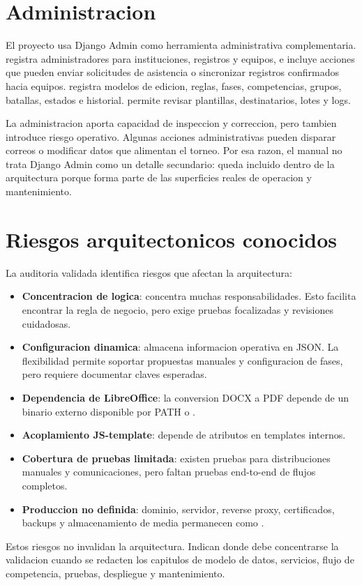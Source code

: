 \section{Administracion}
\label{sec:arquitectura-administracion}

El proyecto usa Django Admin como herramienta administrativa complementaria.  registra administradores para instituciones, registros y equipos, e incluye acciones que pueden enviar solicitudes de asistencia o sincronizar registros confirmados hacia equipos.  registra modelos de edicion, reglas, fases, competencias, grupos, batallas, estados e historial.  permite revisar plantillas, destinatarios, lotes y logs.

La administracion aporta capacidad de inspeccion y correccion, pero tambien introduce riesgo operativo. Algunas acciones administrativas pueden disparar correos o modificar datos que alimentan el torneo. Por esa razon, el manual no trata Django Admin como un detalle secundario: queda incluido dentro de la arquitectura porque forma parte de las superficies reales de operacion y mantenimiento.

\section{Riesgos arquitectonicos conocidos}
\label{sec:arquitectura-riesgos}

La auditoria validada identifica riesgos que afectan la arquitectura:

\begin{itemize}
  \item \textbf{Concentracion de logica}:  concentra muchas responsabilidades. Esto facilita encontrar la regla de negocio, pero exige pruebas focalizadas y revisiones cuidadosas.
  \item \textbf{Configuracion dinamica}:  almacena informacion operativa en JSON. La flexibilidad permite soportar propuestas manuales y configuracion de fases, pero requiere documentar claves esperadas.
  \item \textbf{Dependencia de LibreOffice}: la conversion DOCX a PDF depende de un binario externo disponible por PATH o .
  \item \textbf{Acoplamiento JS-template}:  depende de atributos  en templates internos.
  \item \textbf{Cobertura de pruebas limitada}: existen pruebas para distribuciones manuales y comunicaciones, pero faltan pruebas end-to-end de flujos completos.
  \item \textbf{Produccion no definida}: dominio, servidor, reverse proxy, certificados, backups y almacenamiento de media permanecen como \MarcadorProduccionPendiente.
\end{itemize}

Estos riesgos no invalidan la arquitectura. Indican donde debe concentrarse la validacion cuando se redacten los capitulos de modelo de datos, servicios, flujo de competencia, pruebas, despliegue y mantenimiento.
